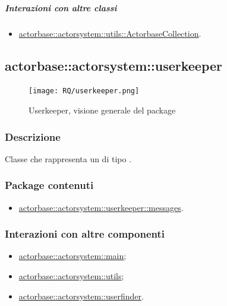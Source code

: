\documentclass{scalatekids-article}
\begin{document}
\subparagraph{Interazioni con altre classi}
\begin{itemize}
\item \hyperref[sec:actorbase::actorsystem::utils::ActorbaseCollection]{actorbase::actorsystem::utils::ActorbaseCollection}.
\end{itemize}



\subsection{actorbase::actorsystem::userkeeper} %
\label{sec:actorbase::actorsystem::userkeeper}

\begin{figure}[H]
  \begin{center}
    \texttt{[image: RQ/userkeeper.png]}
    \caption{Userkeeper, visione generale del package}
  \end{center}
\end{figure}

\subsubsection{Descrizione}
Classe che rappresenta un  di tipo .

\subsubsection{Package contenuti}
\begin{itemize}
\item \hyperref[sec:actorbase::actorsystem::userkeeper::messages]{actorbase::actorsystem::userkeeper::messages}.
\end{itemize}

\subsubsection{Interazioni con altre componenti}
\begin{itemize}
\item \hyperref[sec:actorbase::actorsystem::main]{actorbase::actorsystem::main};
\item \hyperref[sec:actorbase::actorsystem::utils]{actorbase::actorsystem::utils};
\item \hyperref[sec:actorbase::actorsystem::userfinder]{actorbase::actorsystem::userfinder}.
\end{itemize}
\end{document}
